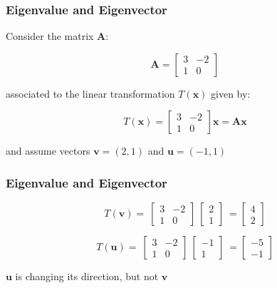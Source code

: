 \documentclass[12pt]{beamer}\usepackage[]{graphicx}\usepackage[]{color}
\begin{document}
\begin{frame}
\frametitle{Eigenvalue and Eigenvector}

Consider the matrix $\mathbf{A}$:

$$
\mathbf{A} =
\begin{bmatrix} 
3 & -2 \\
1 & 0
\end{bmatrix}
$$

associated to the linear transformation $T(\mathbf{x})$ given by:

$$
T(\mathbf{x}) = 
\begin{bmatrix} 
3 & -2 \\
1 & 0
\end{bmatrix}
\mathbf{x} = \mathbf{Ax}
$$

and assume vectors $\mathbf{v} = (2, 1)$ and $\mathbf{u} = (-1, 1)$

\end{frame}

  
\begin{frame}
\frametitle{Eigenvalue and Eigenvector}

$$
T(\mathbf{v}) = 
\
\begin{bmatrix} 
3 & -2 \\
1 & 0
\end{bmatrix}
\
\begin{bmatrix} 
2 \\
1
\end{bmatrix}
\
=
\begin{bmatrix} 
4 \\
2
\end{bmatrix}
$$

$$
T(\mathbf{u}) = 
\
\begin{bmatrix} 
3 & -2 \\
1 & 0
\end{bmatrix}
\
\begin{bmatrix} 
-1 \\
1
\end{bmatrix}
\
=
\begin{bmatrix} 
-5 \\
-1
\end{bmatrix}
$$

\begin{center}

$\mathbf{u}$ is changing its direction, but not $\mathbf{v}$
\end{center}

\end{frame}
\end{document}
